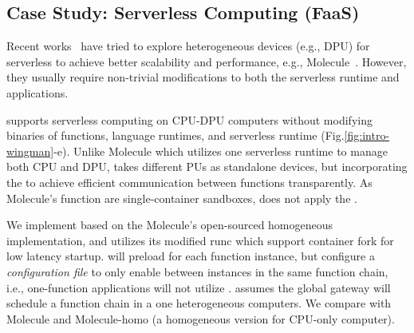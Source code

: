\subsection{Case Study: Serverless Computing (FaaS)}
\label{s:case-FaaS}

Recent works~\cite{10.1145/3472883.3486972, 10.1145/3503222.3507732, copik2022rfaas, wei2022provisioned} have tried to explore heterogeneous devices (e.g., DPU) for serverless to achieve better scalability and performance, e.g., Molecule~\cite{10.1145/3503222.3507732}. %
However, they usually require non-trivial modifications to both the serverless runtime and applications.

\sys supports serverless computing on CPU-DPU computers without modifying binaries of functions, language runtimes, and serverless runtime (Fig.\ref{fig:intro-wingman}-e).
Unlike Molecule which utilizes one serverless runtime to manage both CPU and DPU, \faas takes different PUs as standalone devices, but incorporating the \os to achieve efficient communication between functions transparently.
As Molecule's function are single-container sandboxes, \faas does not apply the \giptable.


We implement \faas based on the Molecule's open-sourced homogeneous implementation, and utilizes its modified runc which support container fork for low latency startup.
\faas will preload \os for each function instance, but configure a \emph{configuration file} to only enable \gsocket between instances in the same function chain, i.e., one-function applications will not utilize \os.
\faas assumes the global gateway will schedule a function chain in a one heterogeneous computers.
We compare \faas with Molecule and Molecule-homo (a homogeneous version for CPU-only computer).



